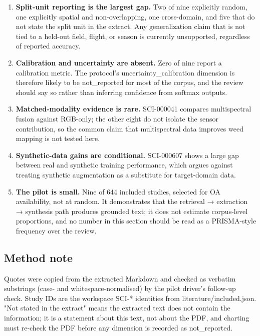 \documentclass{article}
\begin{document}
\begin{enumerate}
\item \textbf{Split-unit reporting is the largest gap.} Two of nine explicitly random, one
   explicitly spatial and non-overlapping, one cross-domain, and five that do not
   state the split unit in the extract. Any generalization claim that is not tied
   to a held-out field, flight, or season is currently unsupported, regardless of
   reported accuracy.
\item \textbf{Calibration and uncertainty are absent.} Zero of nine report a calibration
   metric. The protocol's uncertainty\_calibration dimension is therefore likely to
   be not\_reported for most of the corpus, and the review should say so rather than
   inferring confidence from softmax outputs.
\item \textbf{Matched-modality evidence is rare.} SCI-000041 compares multispectral fusion
   against RGB-only; the other eight do not isolate the sensor contribution, so the
   common claim that multispectral data improves weed mapping is not tested here.
\item \textbf{Synthetic-data gains are conditional.} SCI-000607 shows a large gap between
   real and synthetic training performance, which argues against treating synthetic
   augmentation as a substitute for target-domain data.
\item \textbf{The pilot is small.} Nine of 644 included studies, selected for OA
   availability, not at random. It demonstrates that the retrieval → extraction →
   synthesis path produces grounded text; it does not estimate corpus-level
   proportions, and no number in this section should be read as a PRISMA-style
   frequency over the review.
\end{enumerate}

\subsection{Method note}

Quotes were copied from the extracted Markdown and checked as verbatim substrings
(case- and whitespace-normalised) by the pilot driver's follow-up check. Study IDs
are the workspace SCI-* identities from literature/included.json. "Not stated in
the extract" means the extracted text does not contain the information; it is a
statement about this text, not about the PDF, and charting must re-check the PDF
before any dimension is recorded as not\_reported.


\end{document}
